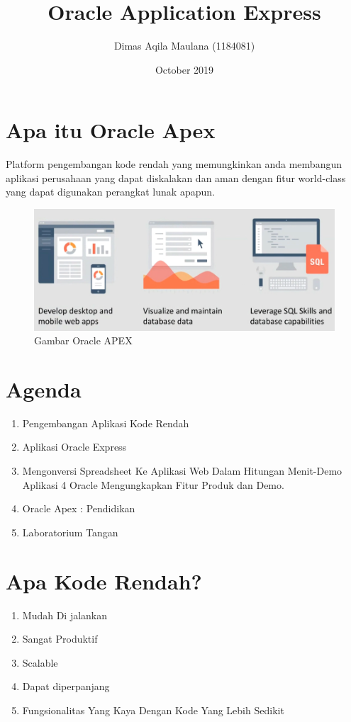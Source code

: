 \documentclass[12pt, times new roman, a4paper]{article}
\title{Oracle Application Express}
\author{Dimas Aqila Maulana (1184081)}
\date{October 2019}
\begin{document}
\maketitle

\section{Apa itu Oracle Apex}

Platform pengembangan kode rendah yang memungkinkan anda membangun
aplikasi perusahaan yang dapat diskalakan dan aman dengan ﬁtur world-class yang dapat digunakan perangkat lunak apapun.\\

\begin{figure}[h]
	\centering
		\includegraphics[scale=0.5]{Gambar/2}
	\caption{Gambar Oracle APEX}
\end{figure}

\section{Agenda}
\begin{enumerate}
    \item Pengembangan Aplikasi Kode Rendah
    \item Aplikasi Oracle Express
    \item Mengonversi Spreadsheet Ke Aplikasi Web Dalam Hitungan Menit-Demo Aplikasi 4 Oracle Mengungkapkan Fitur Produk dan Demo.
    \item Oracle Apex : Pendidikan
    \item Laboratorium Tangan
\end{enumerate}

\section{Apa Kode Rendah?}
\begin{enumerate}
    \item Mudah Di jalankan
    \item Sangat Produktif
    \item Scalable
    \item Dapat diperpanjang
    \item Fungsionalitas Yang Kaya Dengan Kode Yang Lebih Sedikit
\end{enumerate}
\end{document}

